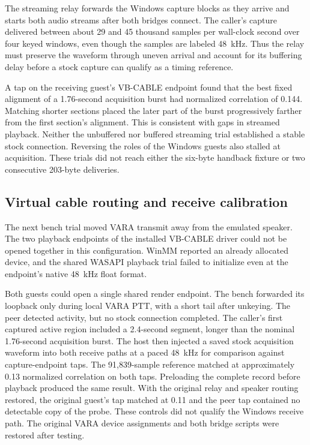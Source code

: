 \documentclass[11pt,a4paper]{article}
\begin{document}
The streaming relay forwards the Windows capture blocks as they
arrive and starts both audio streams after both bridges connect.
The caller's capture delivered between about 29 and 45 thousand
samples per wall-clock second over four keyed windows, even though
the samples are labeled 48~kHz. Thus the relay must preserve the
waveform through uneven arrival and account for its buffering delay
before a stock capture can qualify as a timing reference.

A tap on the receiving guest's VB-CABLE endpoint found that the
best fixed alignment of a 1.76-second acquisition burst had
normalized correlation of 0.144. Matching shorter sections
placed the later part of the burst progressively farther from
the first section's alignment. This is consistent with gaps in
streamed playback. Neither the unbuffered nor buffered
streaming trial established a stable stock connection. Reversing
the roles of the Windows guests also stalled at acquisition. These
trials did not reach either the six-byte handback fixture or
two consecutive 203-byte deliveries.

\subsection{Virtual cable routing and receive calibration}

The next bench trial moved VARA transmit away from the emulated
speaker. The two playback endpoints of the installed VB-CABLE
driver could not be opened together in this configuration.
WinMM reported an already allocated device, and the shared
WASAPI playback trial failed to initialize even at the
endpoint's native 48~kHz float format.

Both guests could open a single shared render endpoint. The
bench forwarded its loopback only during local VARA PTT, with a
short tail after unkeying. The peer detected activity, but no
stock connection completed. The caller's first captured active
region included a 2.4-second segment, longer than the nominal
1.76-second acquisition burst. The host then injected a saved
stock acquisition waveform into both receive paths at a paced
48~kHz for comparison against capture-endpoint taps.
The 91,839-sample reference matched at approximately 0.13
normalized correlation on both taps. Preloading the complete
record before playback produced the same result. With the
original relay and speaker routing restored, the original
guest's tap matched at 0.11 and the peer tap contained no
detectable copy of the probe. These controls did not qualify the
Windows receive path. The original VARA device assignments and
both bridge scripts were restored after testing.
\end{document}
